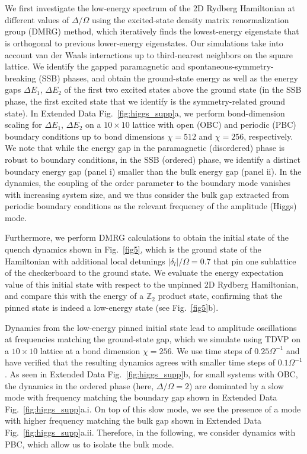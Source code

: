 \documentclass[reprint,twocolumn,secnumarabic,amssymb, aps, prx]{revtex4-2}
\begin{document}
 \\
\\
We first investigate the low-energy spectrum of the 2D Rydberg Hamiltonian at different values of $\Delta/\Omega$ using the excited-state density matrix renormalization group (DMRG) method, which iteratively finds the lowest-energy eigenstate that is orthogonal to previous lower-energy eigenstates. Our simulations take into account van der Waals interactions up to third-nearest neighbors on the square lattice.
We identify the gapped paramagnetic and spontaneous-symmetry-breaking (SSB) phases, and obtain the ground-state energy as well as the energy gaps $\Delta E_1$, $\Delta E_2$ of the first two excited states above the ground state (in the SSB phase, the first excited state that we identify is the symmetry-related ground state). 
In Extended Data Fig.~\ref{fig:higgs_supp}a, we perform bond-dimension scaling for  $\Delta E_1$, $\Delta E_2$ on a $10 \times 10$ lattice with open (OBC) and periodic (PBC) boundary conditions up to bond dimensions $\chi=512$ and $\chi=256$, respectively. We note that while the energy gap in the paramagnetic (disordered) phase is robust to boundary conditions, in the SSB (ordered) phase, we identify a distinct boundary energy gap (panel i) smaller than the bulk energy gap (panel ii). In the dynamics, the coupling of the order parameter to the boundary mode vanishes with increasing system size, and we thus consider the bulk gap extracted from periodic boundary conditions as the relevant frequency of the amplitude (Higgs) mode.

Furthermore, we perform DMRG calculations to obtain the initial state of the quench dynamics shown in Fig.~\ref{fig5}, which is the ground state of the Hamiltonian with additional local detunings $|\delta_l|/\Omega=0.7$ that pin one sublattice of the checkerboard to the ground state. We evaluate the energy expectation value of this initial state with respect to the unpinned 2D Rydberg Hamiltonian, and compare this with the energy of a $\mathbb{Z}_2$ product state, confirming that the pinned state is indeed a low-energy state (see Fig.~\ref{fig5}b).

Dynamics from the low-energy pinned initial state lead to amplitude oscillations at frequencies matching the ground-state gap, which we simulate using TDVP \cite{haegeman2011tdvp,haegeman2016tdvp} on a $10 \times 10$ lattice at a bond dimension $\chi=256$. 
We use time steps of $0.25 \Omega^{-1}$ and have verified that the resulting dynamics agrees with smaller time steps of $0.1\Omega^{-1}$. 
As seen in Extended Data Fig.~\ref{fig:higgs_supp}b, for small systems with OBC, the dynamics in the ordered phase (here, $\Delta/\Omega=2$) are dominated by a slow mode with frequency matching the boundary gap shown in Extended Data Fig.~\ref{fig:higgs_supp}a.i. 
On top of this slow mode, we see the presence of a mode with higher frequency matching the bulk gap shown in Extended Data Fig.~\ref{fig:higgs_supp}a.ii. Therefore, in the following, we consider dynamics with PBC, which allow us to isolate the bulk mode. 
\end{document}
